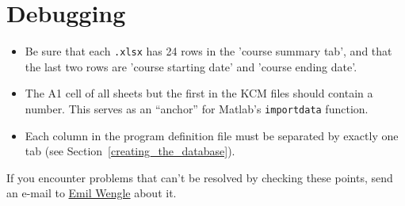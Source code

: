 \section{Debugging}
\label{sec:debugging}
\begin{itemize}

\item Be sure that each \texttt{.xlsx} has 24 rows in the 'course
	summary tab', and that the last two rows are 'course
	starting date' and 'course ending date'.

\item The A1 cell of all sheets but the first in the
	\ac{KCM} files should contain a number. This serves as an
	``anchor'' for Matlab's \texttt{importdata} function.

\item Each column in the program definition file must be separated
	by exactly one tab (see Section~\ref{creating_the_database}).

\end{itemize}

If you encounter problems that can't be resolved by checking these points,
send an e-mail to \href{mailto:emil.wengle.7375@student.uu.se}
{Emil Wengle} about it.


